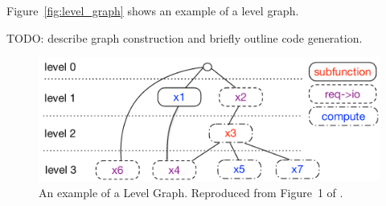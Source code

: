 Figure~\ref{fig:level_graph} shows an example of a level graph. 

TODO: describe graph construction and briefly outline code generation.

\begin{figure}[th]
	\centering
	\includegraphics[width=\textwidth]{figures/level-graph.pdf}
	\caption{An example of a Level Graph. Reproduced from Figure~1 of \cite{goens_multiprog18}.}
	\label{fig:histograms}
\end{figure}